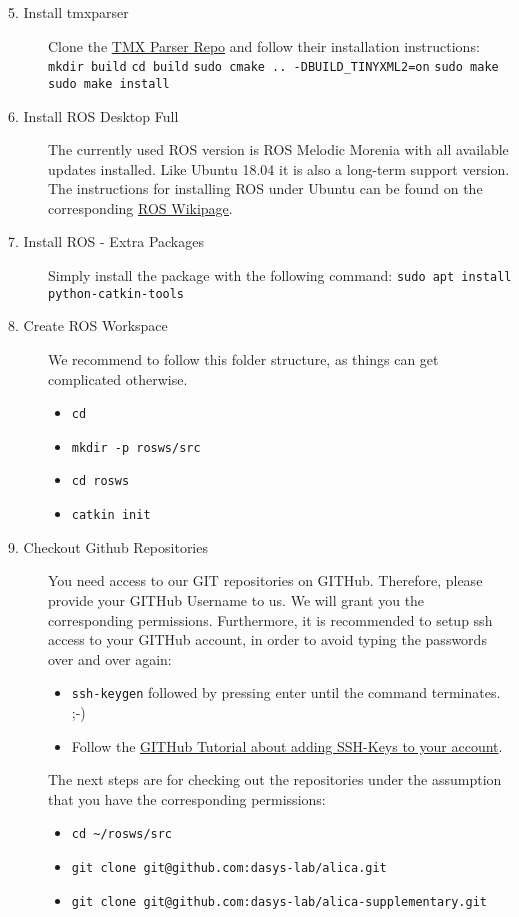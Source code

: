 \begin{description}
	\item[5. Install tmxparser] Clone the \href{git@github.com:dasys-lab/tmxparser.git}{TMX Parser Repo} and follow their installation instructions:\\
\verb#mkdir build#
\verb#cd build#
\verb#sudo cmake .. -DBUILD_TINYXML2=on#
\verb#sudo make#
\verb#sudo make install#
	\item[6. Install ROS Desktop Full] The currently used ROS version is ROS Melodic Morenia with all available updates installed. Like Ubuntu 18.04 it is also a long-term support version. The instructions for installing ROS under Ubuntu can be found on the corresponding \href{http://wiki.ros.org/melodic/Installation/Ubuntu}{ROS Wikipage}.
	\item[7. Install ROS - Extra Packages] Simply install the package with the following command: \verb#sudo apt install python-catkin-tools#
	\item[8. Create ROS Workspace] We recommend to follow this folder structure, as things can get complicated otherwise. 
	\begin{itemize}
		\item \verb#cd#
		\item \verb#mkdir -p rosws/src#
		\item \verb#cd rosws#
		\item \verb#catkin init#
	\end{itemize}
	\item[9. Checkout Github Repositories] You need access to our GIT repositories on GITHub. Therefore, please provide your GITHub Username to us. We will grant you the corresponding permissions. Furthermore, it is recommended to setup ssh access to your GITHub account, in order to avoid typing the passwords over and over again:
	\begin{itemize}
		\item \verb#ssh-keygen# followed by pressing enter until the command terminates. ;-)
		\item Follow the \href{https://help.github.com/articles/adding-a-new-ssh-key-to-your-github-account/}{GITHub Tutorial about adding SSH-Keys to your account}.
	\end{itemize}
	The next steps are for checking out the repositories under the assumption that you have the corresponding permissions:
	\begin{itemize}
		\item \verb#cd ~/rosws/src#
		\item \verb#git clone git@github.com:dasys-lab/alica.git#
		\item \verb#git clone git@github.com:dasys-lab/alica-supplementary.git#

\end{itemize}
\end{description}
